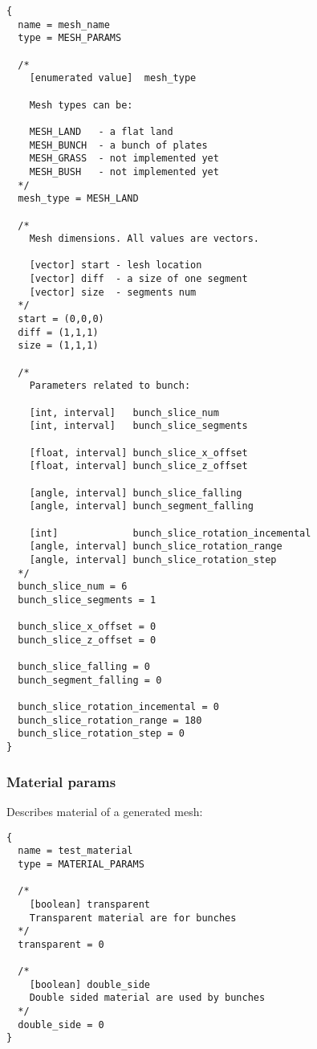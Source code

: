 \documentclass[9pt]{article}
\begin{document}
\begin{verbatim}
{
  name = mesh_name
  type = MESH_PARAMS

  /*
    [enumerated value]  mesh_type
  
    Mesh types can be:
   
    MESH_LAND   - a flat land
    MESH_BUNCH  - a bunch of plates
    MESH_GRASS  - not implemented yet
    MESH_BUSH   - not implemented yet
  */
  mesh_type = MESH_LAND
  
  /*
    Mesh dimensions. All values are vectors.
  
    [vector] start - lesh location 
    [vector] diff  - a size of one segment 
    [vector] size  - segments num
  */  
  start = (0,0,0)
  diff = (1,1,1)
  size = (1,1,1)
  
  /*
    Parameters related to bunch:
    
    [int, interval]   bunch_slice_num
    [int, interval]   bunch_slice_segments
      
    [float, interval] bunch_slice_x_offset
    [float, interval] bunch_slice_z_offset
      
    [angle, interval] bunch_slice_falling
    [angle, interval] bunch_segment_falling
        
    [int]             bunch_slice_rotation_incemental
    [angle, interval] bunch_slice_rotation_range
    [angle, interval] bunch_slice_rotation_step
  */    
  bunch_slice_num = 6
  bunch_slice_segments = 1
  
  bunch_slice_x_offset = 0
  bunch_slice_z_offset = 0
  
  bunch_slice_falling = 0
  bunch_segment_falling = 0
  
  bunch_slice_rotation_incemental = 0
  bunch_slice_rotation_range = 180
  bunch_slice_rotation_step = 0
}
\end{verbatim}

\subsubsection{Material params}

Describes material of a generated mesh:

\begin{verbatim}
{
  name = test_material
  type = MATERIAL_PARAMS
  
  /*
    [boolean] transparent
    Transparent material are for bunches
  */
  transparent = 0
  
  /*
    [boolean] double_side
    Double sided material are used by bunches
  */
  double_side = 0  
}
\end{verbatim}
\end{document}

